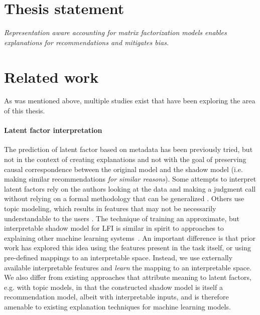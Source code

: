 \section{Thesis statement}

\emph{Representation aware accounting for matrix factorization models enables
explanations for recommendations and mitigates bias.}

\section{Related work}

As was mentioned above, multiple studies exist that have been exploring the
area of this thesis.

\paragraph{Latent factor interpretation}
The prediction of latent factor based on metadata has been
previously tried\cite{gantner2010learning}, but not in the context of creating
explanations and not with the goal of preserving causal correspondence between
the original model and the shadow model (i.e. making similar recommendations
\emph{for similar reasons}). Some attempts to interpret latent
factors rely on the authors looking at the data and making a judgment call
without relying on a formal methodology that can be generalized
\cite{koren2009matrix}. Others use topic modeling, which results in features
that may not be necessarily understandable to the users
\cite{rossetti2013towards}. The technique of training an approximate, but
interpretable shadow
model for LFI is similar in spirit to approaches to explaining other
machine learning
systems~\cite{craven1995extracting,ribeiro2016lime,sanchez2015towards}.
An important difference is that prior work has explored this idea
using the features present in the task itself, or using pre-defined
mappings to an interpretable space. 
Instead, we use externally available interpretable features and
\emph{learn} the mapping to an interpretable space.
We also differ from existing approaches that attribute meaning to
latent factors, e.g.
with topic models\cite{rossetti2013towards}, in that the constructed
shadow model is itself a recommendation model, albeit with
interpretable inputs, and is therefore amenable to existing
explanation techniques for machine learning models.


